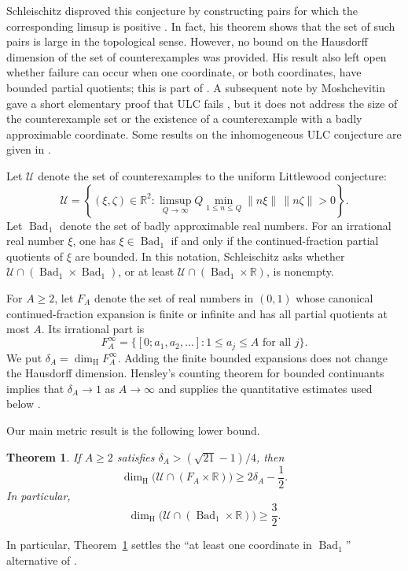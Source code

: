 \documentclass[11pt]{amsart}
\newtheorem{theorem}{Theorem}[section]
\newcommand{\R}{\mathbb R}
\newcommand{\Bad}{\operatorname{Bad}}
\newcommand{\dimH}{\dim_{\mathrm H}}
\begin{document}
Schleischitz disproved this conjecture by constructing pairs for which the
corresponding limsup is positive \cite{SchleischitzULC}.  In fact, his theorem
shows that the set of such pairs is large in the topological sense.  However, no bound on the Hausdorff dimension of the set of counterexamples was provided. His result also
left open whether failure can occur when one coordinate, or both coordinates,
have bounded partial quotients; this is part of
\cite[Problem~2(i)]{SchleischitzULC}.  A subsequent note by Moshchevitin gave
a short elementary proof that ULC fails \cite{MoshchevitinULC}, but it does
not address the size of the counterexample set or the existence
of a counterexample with a badly approximable coordinate. Some results on the inhomogeneous ULC conjecture are given in \cite{SchleischitzULCing}.

Let $\mathcal U$ denote the set of counterexamples to the uniform Littlewood
conjecture:
$$
 \mathcal U=\left\{(\xi,\zeta)\in\R^2:
 \limsup_{Q\to\infty} Q\min_{1\le n\le Q}\|n\xi\|\,\|n\zeta\|>0\right\}.
$$
Let $\Bad_1$ denote the set of badly approximable real numbers.  For an
irrational real number $\xi$, one has $\xi\in\Bad_1$ if and only if the
continued-fraction partial quotients of $\xi$ are bounded.  In this notation,
Schleischitz asks whether $\mathcal U\cap(\Bad_1\times\Bad_1)$, or at least
$\mathcal U\cap(\Bad_1\times\R)$, is nonempty.

For $A\ge2$, let $F_A$ denote the set of real numbers in $(0,1)$ whose canonical
continued-fraction expansion is finite or infinite and has all partial quotients
at most $A$.  Its irrational part is
$$
 F_A^\infty=\{[0;a_1,a_2,\ldots]:1\le a_j\le A\text{ for all }j\}.
$$
We put $\delta_A=\dimH F_A^\infty$.  Adding the finite bounded expansions does
not change the Hausdorff dimension.  Hensley's counting theorem for bounded
continuants implies that $\delta_A\to1$ as $A\to\infty$ and supplies the
quantitative estimates used below \cite{Hensley1990,Hensley1992}.

Our main metric result is the following lower bound.

\begin{theorem}\label{thm:pair-dim}
If $A\ge2$ satisfies $\delta_A>(\sqrt{21}-1)/4$, then
$$
 \dimH\bigl(\mathcal U\cap(F_A\times\R)\bigr)
 \ge 2\delta_A-\frac12.
$$
In particular,
$$
 \dimH\bigl(\mathcal U\cap(\Bad_1\times\R)\bigr)\ge \frac32.
$$
\end{theorem}

In particular, Theorem~\ref{thm:pair-dim} settles the ``at least one coordinate
in $\Bad_1$'' alternative of \cite[Problem~2(i)]{SchleischitzULC}.
\end{document}
